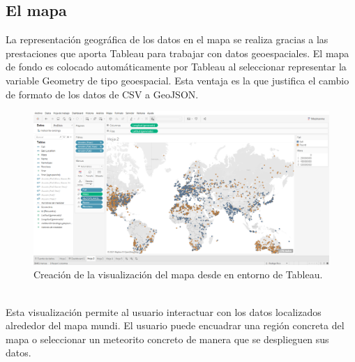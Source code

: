 \documentclass[12pt]{article}
\begin{document}
    \subsection{El mapa}
    La representación geográfica de los datos en el mapa se realiza gracias a las prestaciones que aporta Tableau para trabajar con datos geoespaciales. El mapa de fondo es colocado automáticamente por Tableau al seleccionar representar la variable Geometry de tipo geoespacial. Esta ventaja es la que justifica el cambio de formato de los datos de CSV a GeoJSON.\\
    \begin{figure}[h]
    	\centering
    	\label{Fig:mapa}
    	\includegraphics[width=\textwidth]{Captura de pantalla (63)}
    	\caption{Creación de la visualización del mapa desde en entorno de Tableau.}
    \end{figure}
    \\
	Esta visualización permite al usuario interactuar con los datos localizados alrededor del mapa mundi. El usuario puede encuadrar una región concreta del mapa o seleccionar un meteorito concreto de manera que se desplieguen sus datos.
\end{document}
